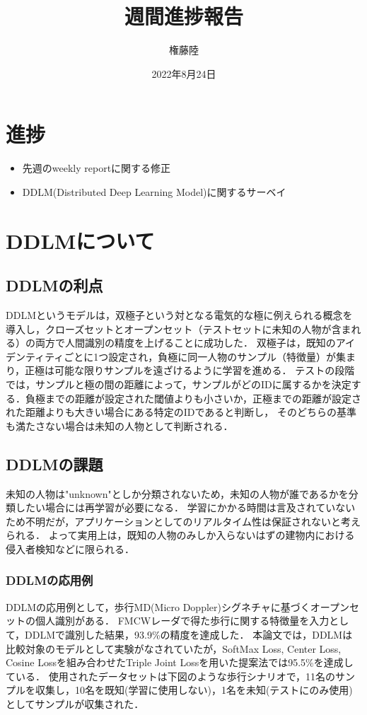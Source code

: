 \documentclass[a4j, dvipdfmx]{jsarticle}
\begin{document}
\title{週間進捗報告}
\author{権藤陸}
\date{2022年8月24日}
\maketitle

\section{進捗}
\begin{itemize}
    \item 先週のweekly reportに関する修正
    \item DDLM(Distributed Deep Learning Model)に関するサーベイ
\end{itemize}

\section{DDLMについて}
\subsection{DDLMの利点\cite{ddlm}}
DDLMというモデルは，双極子という対となる電気的な極に例えられる概念を導入し，クローズセットとオープンセット（テストセットに未知の人物が含まれる）の両方で人間識別の精度を上げることに成功した．
双極子は，既知のアイデンティティごとに1つ設定され，負極に同一人物のサンプル（特徴量）が集まり，正極は可能な限りサンプルを遠ざけるように学習を進める．
テストの段階では，サンプルと極の間の距離によって，サンプルがどのIDに属するかを決定する．負極までの距離が設定された閾値よりも小さいか，正極までの距離が設定された距離よりも大きい場合にある特定のIDであると判断し，
そのどちらの基準も満たさない場合は未知の人物として判断される．

\subsection{DDLMの課題}
未知の人物は"unknown"としか分類されないため，未知の人物が誰であるかを分類したい場合には再学習が必要になる．
学習にかかる時間は言及されていないため不明だが，アプリケーションとしてのリアルタイム性は保証されないと考えられる．
よって実用上は，既知の人物のみしか入らないはずの建物内における侵入者検知などに限られる．


\subsubsection{DDLMの応用例\cite{MD}}
DDLMの応用例として，歩行MD(Micro Doppler)シグネチャに基づくオープンセットの個人識別がある．
FMCWレーダで得た歩行に関する特徴量を入力として，DDLMで識別した結果，93.9\%の精度を達成した．
本論文では，DDLMは比較対象のモデルとして実験がなされていたが，SoftMax Loss, Center Loss, Cosine Lossを組み合わせたTriple Joint Lossを用いた提案法では95.5\%を達成している．
使用されたデータセットは下図のような歩行シナリオで，11名のサンプルを収集し，10名を既知(学習に使用しない)，1名を未知(テストにのみ使用)としてサンプルが収集された．
\end{document}
